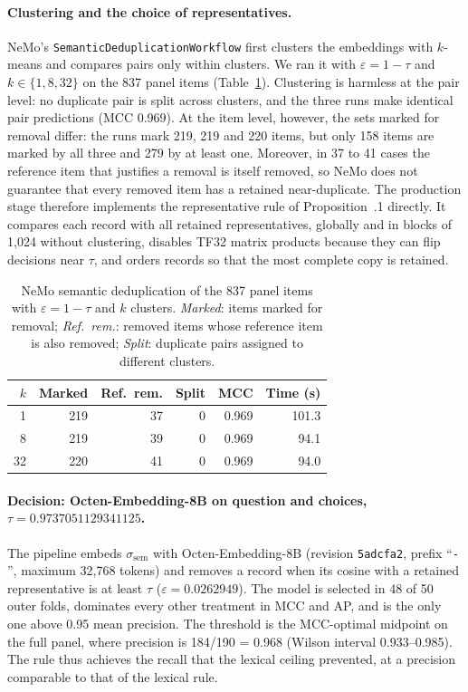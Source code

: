 \paragraph{Clustering and the choice of representatives.} NeMo's
\texttt{SemanticDeduplicationWorkflow} first clusters the embeddings with
$k$-means and compares pairs only within clusters. We ran it with
$\varepsilon = 1-\tau$ and $k\in\{1,8,32\}$ on the 837 panel items
(Table~\ref{tab:dedup-nemo}). Clustering is harmless at the pair level: no
duplicate pair is split across clusters, and the three runs make identical
pair predictions (MCC 0.969). At the item level, however, the sets marked for
removal differ: the runs mark 219, 219 and 220 items, but only 158 items are
marked by all three and 279 by at least one. Moreover, in 37 to 41 cases the
reference item that justifies a removal is itself removed, so NeMo does not
guarantee that every removed item has a retained near-duplicate. The
production stage therefore implements the representative rule of
Proposition~\thesection.1 directly. It compares each record with all retained
representatives, globally and in blocks of 1,024 without clustering, disables
TF32 matrix products because they can flip decisions near $\tau$, and orders
records so that the most complete copy is retained.

\begin{table}[t]
\centering
\footnotesize
\setlength{\tabcolsep}{4pt}
\begin{tabular}{@{}rrrrrr@{}}
\toprule
$k$ & Marked & Ref.\ rem. & Split & MCC & Time (s) \\
\midrule
1 & 219 & 37 & 0 & 0.969 & 101.3 \\
8 & 219 & 39 & 0 & 0.969 & 94.1 \\
32 & 220 & 41 & 0 & 0.969 & 94.0 \\
\bottomrule
\end{tabular}
\caption{NeMo semantic deduplication of the 837 panel items with
$\varepsilon=1-\tau$ and $k$ clusters. \emph{Marked}: items marked for
removal; \emph{Ref.\ rem.}: removed items whose reference item is also
removed; \emph{Split}: duplicate pairs assigned to different clusters.}
\label{tab:dedup-nemo}
\end{table}

\paragraph{Decision: Octen-Embedding-8B on question and choices,
$\tau=0.9737051129341125$.} The pipeline embeds $\sigma_{\mathrm{sem}}$ with
Octen-Embedding-8B (revision \texttt{5adcfa2}, prefix ``\texttt{- }'',
maximum 32,768 tokens) and removes a record when its cosine with a retained
representative is at least $\tau$ ($\varepsilon=0.0262949$). The model is
selected in 48 of 50 outer folds, dominates every other treatment in MCC and
AP, and is the only one above 0.95 mean precision. The threshold is the
MCC-optimal midpoint on the full panel, where precision is 184/190 = 0.968
(Wilson interval 0.933--0.985). The rule thus achieves the recall that the
lexical ceiling prevented, at a precision comparable to that of the lexical
rule.

